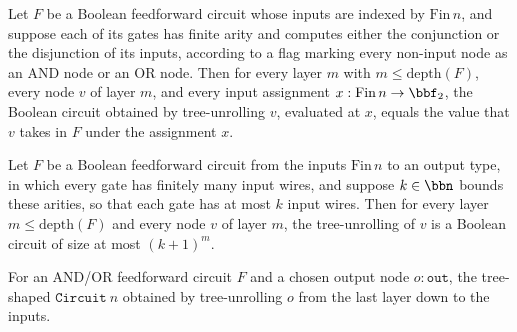 \begin{theorem}
\label{BoolCircuit.nodeToCircuit_eval}
\leanok
{}
Let $F$ be a Boolean feedforward circuit whose inputs are indexed by $\mathrm{Fin}\,n$,
and suppose each of its gates has finite arity and computes either the conjunction or
the disjunction of its inputs, according to a flag marking every non-input node as an
AND node or an OR node. Then for every layer $m$ with $m \le \mathrm{depth}(F)$, every
node $v$ of layer $m$, and every input assignment $x : \mathrm{Fin}\,n \to \bbf_2$, the
Boolean circuit obtained by tree-unrolling $v$, evaluated at $x$, equals the value that
$v$ takes in $F$ under the assignment $x$.
\end{theorem}

\begin{theorem}
\label{BoolCircuit.nodeToCircuit_size_le}
\leanok
{}
Let $F$ be a Boolean feedforward circuit from the inputs $\mathrm{Fin}\,n$ to an output
type, in which every gate has finitely many input wires, and suppose $k \in \bbn$ bounds
these arities, so that each gate has at most $k$ input wires. Then for every layer $m
\le \mathrm{depth}(F)$ and every node $v$ of layer $m$, the tree-unrolling of $v$ is a
Boolean circuit of size at most $(k+1)^m$.
\end{theorem}

\begin{definition}
\label{BoolCircuit.FeedForward.toCircuit}
\leanok
{}
For an AND/OR feedforward circuit $F$ and a chosen output node $o : \texttt{out}$,
the tree-shaped $\texttt{Circuit}\ n$ obtained by tree-unrolling $o$ from the last
layer down to the inputs.
\end{definition}

